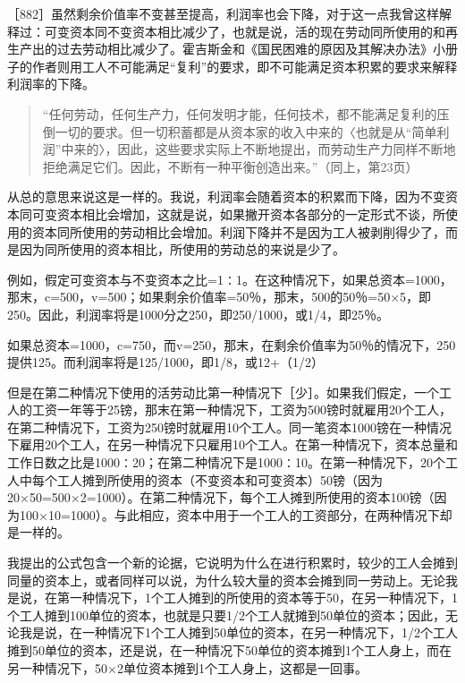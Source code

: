 ［882］虽然剩余价值率不变甚至提高，利润率也会下降，对于这一点我曾这样解释过：可变资本同不变资本相比减少了，也就是说，活的现在劳动同所使用的和再生产出的过去劳动相比减少了。霍吉斯金和《国民困难的原因及其解决办法》小册子的作者则用工人不可能满足“复利”的要求，即不可能满足资本积累的要求来解释利润率的下降。

\begin{quote}{“任何劳动，任何生产力，任何发明才能，任何技术，都不能满足复利的压倒一切的要求。但一切积蓄都是从资本家的收入中来的〈也就是从“简单利润”中来的〉，因此，这些要求实际上不断地提出，而劳动生产力同样不断地拒绝满足它们。因此，不断有一种平衡创造出来。”（同上，第23页）}\end{quote}

从总的意思来说这是一样的。我说，利润率会随着资本的积累而下降，因为不变资本同可变资本相比会增加，这就是说，如果撇开资本各部分的一定形式不谈，所使用的资本同所使用的劳动相比会增加。利润下降并不是因为工人被剥削得少了，而是因为同所使用的资本相比，所使用的劳动总的来说是少了。

例如，假定可变资本与不变资本之比=1∶1。在这种情况下，如果总资本=1000，那末，c=500，v=500；如果剩余价值率=50％，那末，500的50％=50×5，即250。因此，利润率将是1000分之250，即250/1000，或1/4，即25％。

如果总资本=1000，c=750，而v=250，那末，在剩余价值率为50％的情况下，250提供125。而利润率将是125/1000，即1/8，或12+（1/2）%

但是在第二种情况下使用的活劳动比第一种情况下［少］。如果我们假定，一个工人的工资一年等于25镑，那末在第一种情况下，工资为500镑时就雇用20个工人，在第二种情况下，工资为250镑时就雇用10个工人。同一笔资本1000镑在一种情况下雇用20个工人，在另一种情况下只雇用10个工人。在第一种情况下，资本总量和工作日数之比是1000∶20；在第二种情况下是1000∶10。在第一种情况下，20个工人中每个工人摊到所使用的资本（不变资本和可变资本）50镑（因为20×50=500×2=1000）。在第二种情况下，每个工人摊到所使用的资本100镑（因为100×10=1000）。与此相应，资本中用于一个工人的工资部分，在两种情况下却是一样的。

我提出的公式包含一个新的论据，它说明为什么在进行积累时，较少的工人会摊到同量的资本上，或者同样可以说，为什么较大量的资本会摊到同一劳动上。无论我是说，在第一种情况下，1个工人摊到的所使用的资本等于50，在另一种情况下，1个工人摊到100单位的资本，也就是只要1/2个工人就摊到50单位的资本；因此，无论我是说，在一种情况下1个工人摊到50单位的资本，在另一种情况下，1/2个工人摊到50单位的资本，还是说，在一种情况下50单位的资本摊到1个工人身上，而在另一种情况下，50×2单位资本摊到1个工人身上，这都是一回事。

